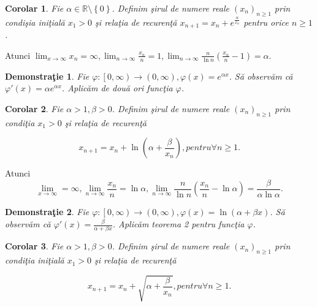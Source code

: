 \documentclass[a4paper,12pt,oneside]{report}
\newtheorem{demonstration}{Demonstra\c tie}
\newtheorem{corollary}{Corolar}
\begin{document}
\begin{corollary}
  Fie \(\alpha \in \mathbb{R} \setminus \left \{ 0 \right \}\). Definim \c sirul de numere reale \(\left ( x_{n} \right )_{n\geq 1}\) prin condi\c sia ini\c tial\u a \(x_{1}> 0\) \c si rela\c tia de recuren\c t\u a \(x_{n+1}= x_{n}+ e^{\frac{\alpha }{x_{n}}}\) pentru orice \(n\geq 1\).
\end{corollary}
 
Atunci \(\lim_{x \to \infty }x_{n} = \infty , \lim_{n \to \infty }\frac{x_{n}}{n} = 1, \lim_{n \to \infty }\frac{n}{\ln n }\left ( \frac{x_{n}}{n} -1\right ) = \alpha\). 

\begin{demonstration}
  Fie \(\varphi :\left [ 0,\infty  \right ) \to \left ( 0,\infty \right ), \varphi \left ( x \right ) = e^{\alpha x}\). S\u a observ\u am c\u a \({\varphi }'\left ( x \right ) = \alpha e^{\alpha x}\). Aplic\u am de dou\u a ori func\c tia \(\varphi\). 
\end{demonstration}


\begin{corollary}
  Fie \(\alpha > 1,\beta > 0\). Definim \c sirul de numere reale \(\left ( x_{n} \right )_{n\geq 1}\) prin condi\c tia \(x_{1} > 0\) \c si rela\c tia de recuren\c t\u a 
\end{corollary}

\begin{displaymath}
  x_{n+1} = x_{n} + \ln\left ( \alpha +\frac{\beta }{x_{n}} \right ), pentru \forall n\geq 1.
\end{displaymath}


Atunci 
\begin{displaymath}
  \lim_{x \to \infty }=\infty ,\lim_{n \to \infty }\frac{x_{n}}{n} = \ln \alpha , \lim_{n \to \infty }\frac{n}{\ln n}\left ( \frac{x_{n}}{n} - \ln \alpha \right ) = \frac{\beta }{\alpha \ln \alpha }.
\end{displaymath}
 
\begin{demonstration}
  Fie \(\varphi :\left [ 0,\infty  \right ) \to \left ( 0,\infty  \right ), \varphi \left ( x \right ) = \ln \left ( \alpha   + \beta x \right )\). S\u a observ\u am c\u a \({\varphi }'\left ( x \right ) = \frac{\beta }{\alpha +\beta x}\). Aplic\u am teorema 2 pentru func\c tia \(\varphi\).
\end{demonstration}


\begin{corollary}
  Fie \(\alpha > 1,\beta > 0\). Definim \c sirul de numere reale \(\left ( x_{n} \right )_{n\geq 1}\) prin condi\c tia ini\c tial\u a \(x_{1}> 0\) \c si rela\c tia de recuren\c t\u a
\end{corollary}
\begin{displaymath}
  x_{n+1} = x_{n} + \sqrt{\alpha +\frac{\beta }{x_{n}}}, pentru \forall n\geq 1.
\end{displaymath}
\end{document}
